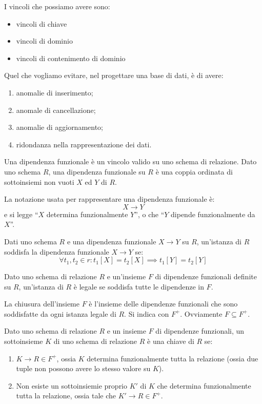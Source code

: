 I vincoli che possiamo avere sono:
\begin{itemize}
    \item vincoli di chiave
    \item vincoli di dominio
    \item vincoli di contenimento di dominio
\end{itemize}

Quel che vogliamo evitare, nel progettare una base di dati, \`e di avere:
\begin{enumerate}
    \item anomalie di inserimento;
    \item anomale di cancellazione;
    \item anomalie di aggiornamento;
    \item ridondanza nella rappresentazione dei dati.
\end{enumerate}

\begin{defn}
Una dipendenza funzionale \`e un vincolo valido su uno schema di relazione. Dato uno schema $R$, una dipendenza funzionale su $R$ \`e una coppia ordinata di sottoinsiemi non vuoti $X$ ed $Y$ di $R$.

La notazione usata per rappresentare una dipendenza funzionale \`e:
\[
X \to Y
\]
e si legge ``$X$ determina funzionalmente $Y$'', o che ``$Y$ dipende funzionalmente da $X$''.
\end{defn}

\begin{defn}
Dati uno schema $R$ e una dipendenza funzionale $X \to Y$ su $R$, un'istanza di $R$ soddisfa la dipendenza funzionale $X \to Y$ se:
\[
\forall t_1, t_2 \in r : t_1[X] = t_2[X] \implies t_1[Y] = t_2[Y]
\]
\end{defn}

Dato uno schema di relazione $R$ e un'insieme $F$ di dipendenze funzionali definite su $R$, un'istanza di $R$ \`e legale se soddisfa tutte le dipendenze in $F$.

La chiusura dell'insieme $F$ \`e l'insieme delle dipendenze funzionali che sono soddisfatte da ogni istanza legale di $R$. Si indica con $F^+$. Ovviamente $F \subseteq F^+$.

\begin{defn}[Chiave]
Dato uno schema di relazione $R$ e un insieme $F$ di dipendenze funzionali, un sottoinsieme $K$ di uno schema di relazione $R$ \`e una chiave di $R$ se:
\begin{enumerate}
    \item $K \to R \in F^+$, ossia $K$ determina funzionalmente tutta la relazione (ossia due tuple non possono avere lo stesso valore su $K$). 
    \item Non esiste un sottoinsiemie proprio $K'$ di $K$ che determina funzionalmente tutta la relazione, ossia tale che $K' \to R \in F^+$. 
\end{enumerate}
\end{defn}

